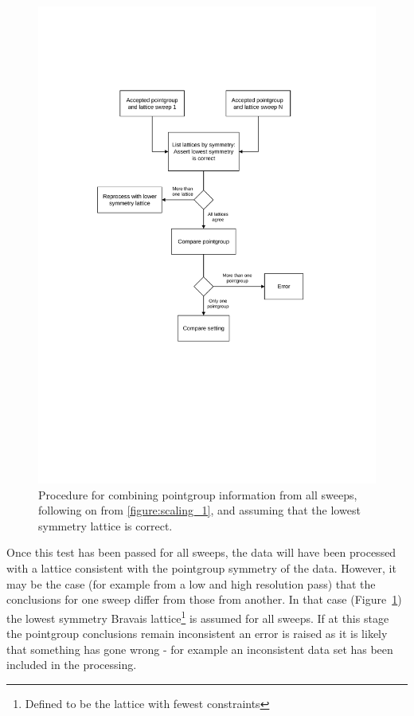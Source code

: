 \documentclass[preprint,pdf]{iucr}
\begin{document}
\begin{figure}
\caption{Procedure for combining pointgroup information from all
  sweeps, following on from \ref{figure:scaling_1}, and assuming that
  the lowest symmetry lattice is correct.
\label{figure:scaling_2}}
\centering
\includegraphics[scale=0.5]{figures/scaling-step-2.pdf}
\end{figure}

Once this test has been passed for all sweeps, the data will have been
processed with a lattice consistent with the pointgroup symmetry of
the data. However, it may be the case (for example from a low and high
resolution pass) that the conclusions for one sweep differ from those
from another. In that case (Figure~\ref{figure:scaling_2}) the lowest
symmetry Bravais lattice\footnote{Defined to be the lattice with
  fewest constraints}
is assumed for all sweeps. If at this stage the pointgroup
conclusions remain inconsistent an error is raised as it is likely
that something has gone wrong - for example an inconsistent data set
has been included in the processing. 
\end{document}
